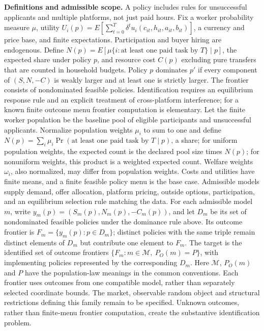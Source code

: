 \documentclass[11pt,a4paper]{article}
\begin{document}
\textbf{Definitions and admissible scope.} A policy includes rules for unsuccessful applicants and multiple platforms, not just paid hours. Fix a worker probability measure \(\mu\), utility \(U_i(p)=E[\sum_{t=0}^T\delta^t u_i(c_{it},h_{it},a_{it},b_{it})]\), a currency and price base, and finite expectations. Participation and buyer hiring are endogenous. Define \(N(p)=E[\mu\{i:\text{at least one paid task by }T\}\mid p]\), the expected share under policy \(p\), and resource cost \(C(p)\) excluding pure transfers that are counted in household budgets. Policy \(p\) dominates \(p'\) if every component of \((S,N,-C)\) is weakly larger and at least one is strictly larger. The frontier consists of nondominated feasible policies. Identification requires an equilibrium response rule and an explicit treatment of cross-platform interference; for a known finite outcome menu frontier computation is elementary. Let the finite worker population be the baseline pool of eligible participants and unsuccessful applicants. Normalize population weights \(\mu_i\) to sum to one and define \(N(p)=\sum_i\mu_i\Pr(\text{at least one paid task by }T\mid p)\), a share; for uniform population weights, the expected count is the declared pool size times \(N(p)\); for nonuniform weights, this product is a weighted expected count. Welfare weights \(\omega_i\), also normalized, may differ from population weights. Costs and utilities have finite means, and a finite feasible policy menu is the base case. Admissible models supply demand, offer allocation, platform pricing, outside options, participation, and an equilibrium selection rule matching the data. For each admissible model \(m\), write \(y_m(p)=(S_m(p),N_m(p),-C_m(p))\), and let \(D_m\) be its set of nondominated feasible policies under the dominance rule above. Its outcome frontier is \(F_m=\{y_m(p):p\in D_m\}\); distinct policies with the same triple remain distinct elements of \(D_m\) but contribute one element to \(F_m\). The target is the identified set of outcome frontiers \(\{F_m:m\in\mathcal M,\ P_O(m)=P\}\), with implementing policies represented by the corresponding \(D_m\). Here \(\mathcal M\), \(P_O(m)\) and \(P\) have the population-law meanings in the common conventions. Each frontier uses outcomes from one compatible model, rather than separately selected coordinate bounds. The market, observable random object and structural restrictions defining this family remain to be specified. Unknown outcomes, rather than finite-menu frontier computation, create the substantive identification problem.
\end{document}
